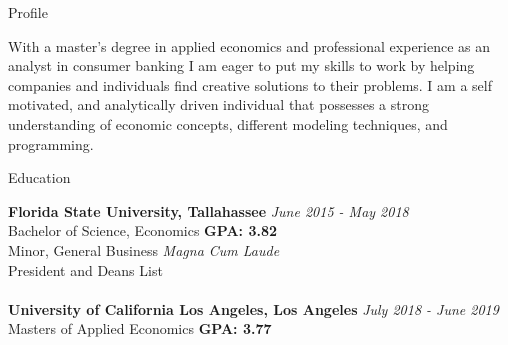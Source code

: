 \documentclass{resume} %
\begin{document}
\begin{rSection}{Profile}

With a master’s degree in applied economics and professional experience as an analyst in consumer banking  I am eager to put my skills to work by helping companies and individuals find creative solutions to their problems. I am a self motivated, and analytically driven individual that possesses a strong understanding of economic concepts, different modeling techniques, and programming. 

\end{rSection}

\begin{rSection}{Education}

{\bf Florida State University, Tallahassee} \hfill {\em June 2015 - May 2018} 
\\ Bachelor of Science, Economics \hfill { \bf GPA: 3.82}
\\ Minor, General Business \hfill {\em Magna Cum Laude}
\\ President and Deans List\\
\\{\bf University of California Los Angeles, Los Angeles} \hfill {\em July 2018 - June 2019} 
\\ Masters of Applied Economics\hfill { \bf GPA: 3.77 }

\end{rSection}
\end{document}
